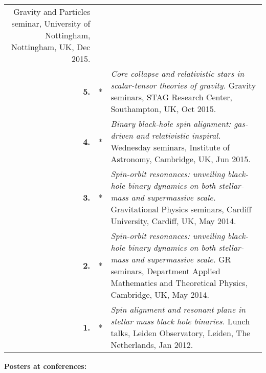 {\begin{longtable}{rp{0.3cm}p{15.8cm}}
\newline{}
Gravity and Particles seminar, University of Nottingham, Nottingham, UK, Dec 2015.
\vspace{0.05cm}\\
%
\textbf{5.} & * & \textit{Core collapse and relativistic stars in scalar-tensor theories of gravity.}
\newline{}
Gravity seminars, STAG Research Center, Southampton, UK, Oct 2015.
\vspace{0.05cm}\\
%
\textbf{4.} & * & \textit{Binary black-hole spin alignment: gas-driven and relativistic inspiral.}
\newline{}
Wednesday seminars, Institute of Astronomy, Cambridge, UK, Jun 2015.
\vspace{0.05cm}\\
%
\textbf{3.} & * & \textit{Spin-orbit resonances: unveiling black-hole binary dynamics on both stellar-mass and supermassive scale.}
\newline{}
Gravitational Physics seminars, Cardiff University, Cardiff, UK, May 2014.
\vspace{0.05cm}\\
%
\textbf{2.} & * & \textit{Spin-orbit resonances: unveiling black-hole binary dynamics on both stellar-mass and supermassive scale.}
\newline{}
GR seminars, Department Applied Mathematics and Theoretical Physics, Cambridge, UK,  May 2014.
\vspace{0.05cm}\\
%
\textbf{1.} & * & \textit{Spin alignment and resonant plane in stellar mass black hole binaries.}
\newline{}
Lunch talks, Leiden Observatory, Leiden, The Netherlands, Jan 2012.
\vspace{0.05cm}\\
%
\end{longtable} }
\textcolor{color1}{\textbf{Posters at conferences:}}
\vspace{-0.5cm}

